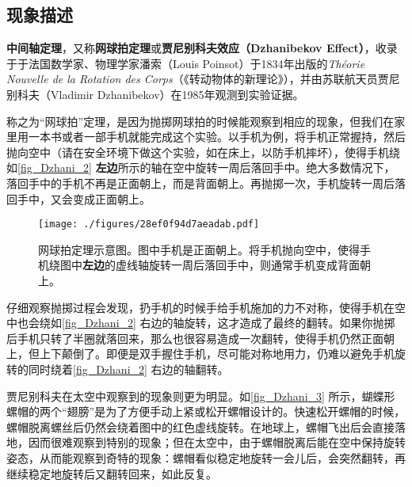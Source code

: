 



\subsection{现象描述}


\textbf{中间轴定理}，又称\textbf{网球拍定理}或\textbf{贾尼别科夫效应（Dzhanibekov Effect）}，收录于于法国数学家、物理学家潘索（Louis Poinsot）于1834年出版的\textsl{Théorie Nouvelle de la Rotation des Corps}（《转动物体的新理论》），并由苏联航天员贾尼别科夫（Vladimir Dzhanibekov）在1985年观测到实验证据。


称之为“网球拍”定理，是因为抛掷网球拍的时候能观察到相应的现象，但我们在家里用一本书或者一部手机就能完成这个实验。以手机为例，将手机正常握持，然后抛向空中（请在安全环境下做这个实验，如在床上，以防手机摔坏），使得手机绕如\autoref{fig_Dzhani_2} \textbf{左边}所示的轴在空中旋转一周后落回手中。绝大多数情况下，落回手中的手机不再是正面朝上，而是背面朝上。再抛掷一次，手机旋转一周后落回手中，又会变成正面朝上。





\begin{figure}[ht]
\centering
\texttt{[image: ./figures/28ef0f94d7aeadab.pdf]}
\caption{网球拍定理示意图。图中手机是正面朝上。将手机抛向空中，使得手机绕图中\textbf{左边}的虚线轴旋转一周后落回手中，则通常手机变成背面朝上。} \label{fig_Dzhani_2}
\end{figure}

仔细观察抛掷过程会发现，扔手机的时候手给手机施加的力不对称，使得手机在空中也会绕如\autoref{fig_Dzhani_2} 右边的轴旋转，这才造成了最终的翻转。如果你抛掷后手机只转了半圈就落回来，那么也很容易造成一次翻转，使得手机仍然正面朝上，但上下颠倒了。即便是双手握住手机，尽可能对称地用力，仍难以避免手机旋转的同时绕着\autoref{fig_Dzhani_2} 右边的轴翻转。


贾尼别科夫在太空中观察到的现象则更为明显。如\autoref{fig_Dzhani_3} 所示，蝴蝶形螺帽的两个“翅膀”是为了方便手动上紧或松开螺帽设计的。快速松开螺帽的时候，螺帽脱离螺丝后仍然会绕着图中的红色虚线旋转。在地球上，螺帽飞出后会直接落地，因而很难观察到特别的现象；但在太空中，由于螺帽脱离后能在空中保持旋转姿态，从而能观察到奇特的现象：螺帽看似稳定地旋转一会儿后，会突然翻转，再继续稳定地旋转后又翻转回来，如此反复。


